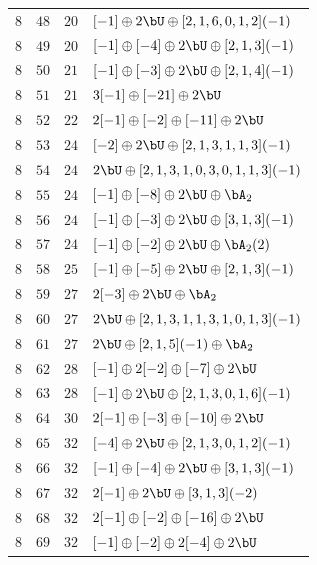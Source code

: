 \begin{center}
\begin{longtable}{llll}
 \(8\) & \(48\) & \(20\) & \([-1] \oplus 2 \bU \oplus [2, 1, 6, 0, 1, 2](-1)\) \\
 \(8\) & \(49\) & \(20\) & \([-1] \oplus [-4] \oplus 2 \bU \oplus [2, 1, 3](-1)\) \\
 \(8\) & \(50\) & \(21\) & \([-1] \oplus [-3] \oplus 2 \bU \oplus [2, 1, 4](-1)\) \\
 \(8\) & \(51\) & \(21\) & \(3 [-1] \oplus [-21] \oplus 2 \bU\) \\
 \(8\) & \(52\) & \(22\) & \(2 [-1] \oplus [-2] \oplus [-11] \oplus 2 \bU\) \\
 \(8\) & \(53\) & \(24\) & \([-2] \oplus 2 \bU \oplus [2, 1, 3, 1, 1, 3](-1)\) \\
 \(8\) & \(54\) & \(24\) & \(2 \bU \oplus [2, 1, 3, 1, 0, 3, 0, 1, 1, 3](-1)\) \\
 \(8\) & \(55\) & \(24\) & \([-1] \oplus [-8] \oplus 2 \bU \oplus \bA_{2}\) \\
 \(8\) & \(56\) & \(24\) & \([-1] \oplus [-3] \oplus 2 \bU \oplus [3, 1, 3](-1)\) \\
 \(8\) & \(57\) & \(24\) & \([-1] \oplus [-2] \oplus 2 \bU \oplus \bA_{2}(2)\) \\
 \(8\) & \(58\) & \(25\) & \([-1] \oplus [-5] \oplus 2 \bU \oplus [2, 1, 3](-1)\) \\
 \(8\) & \(59\) & \(27\) & \(2 [-3] \oplus 2 \bU \oplus \bA_{2}\) \\
 \(8\) & \(60\) & \(27\) & \(2 \bU \oplus [2, 1, 3, 1, 1, 3, 1, 0, 1, 3](-1)\) \\
 \(8\) & \(61\) & \(27\) & \(2 \bU \oplus [2, 1, 5](-1) \oplus \bA_{2}\) \\
 \(8\) & \(62\) & \(28\) & \([-1] \oplus 2 [-2] \oplus [-7] \oplus 2 \bU\) \\
 \(8\) & \(63\) & \(28\) & \([-1] \oplus 2 \bU \oplus [2, 1, 3, 0, 1, 6](-1)\) \\
 \(8\) & \(64\) & \(30\) & \(2 [-1] \oplus [-3] \oplus [-10] \oplus 2 \bU\) \\
 \(8\) & \(65\) & \(32\) & \([-4] \oplus 2 \bU \oplus [2, 1, 3, 0, 1, 2](-1)\) \\
 \(8\) & \(66\) & \(32\) & \([-1] \oplus [-4] \oplus 2 \bU \oplus [3, 1, 3](-1)\) \\
 \(8\) & \(67\) & \(32\) & \(2 [-1] \oplus 2 \bU \oplus [3, 1, 3](-2)\) \\
 \(8\) & \(68\) & \(32\) & \(2 [-1] \oplus [-2] \oplus [-16] \oplus 2 \bU\) \\
 \(8\) & \(69\) & \(32\) & \([-1] \oplus [-2] \oplus 2 [-4] \oplus 2 \bU\) \\

\end{longtable}
\end{center}

